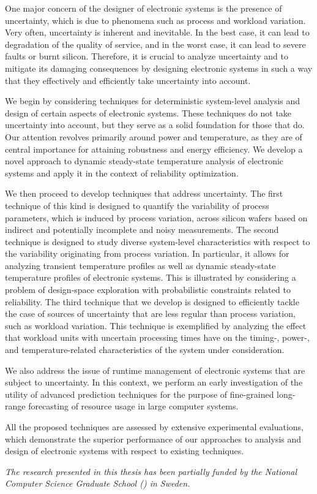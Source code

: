 One major concern of the designer of electronic systems is the presence of
uncertainty, which is due to phenomena such as process and workload variation.
Very often, uncertainty is inherent and inevitable. In the best case, it can
lead to degradation of the quality of service, and in the worst case, it can
lead to severe faults or burnt silicon. Therefore, it is crucial to analyze
uncertainty and to mitigate its damaging consequences by designing electronic
systems in such a way that they effectively and efficiently take uncertainty
into account.

We begin by considering techniques for deterministic system-level analysis and
design of certain aspects of electronic systems. These techniques do not take
uncertainty into account, but they serve as a solid foundation for those that
do. Our attention revolves primarily around power and temperature, as they are
of central importance for attaining robustness and energy efficiency. We develop
a novel approach to dynamic steady-state temperature analysis of electronic
systems and apply it in the context of reliability optimization.

We then proceed to develop techniques that address uncertainty. The first
technique of this kind is designed to quantify the variability of process
parameters, which is induced by process variation, across silicon wafers based
on indirect and potentially incomplete and noisy measurements. The second
technique is designed to study diverse system-level characteristics with respect
to the variability originating from process variation. In particular, it allows
for analyzing transient temperature profiles as well as dynamic steady-state
temperature profiles of electronic systems. This is illustrated by considering a
problem of design-space exploration with probabilistic constraints related to
reliability. The third technique that we develop is designed to efficiently
tackle the case of sources of uncertainty that are less regular than process
variation, such as workload variation. This technique is exemplified by
analyzing the effect that workload units with uncertain processing times have on
the timing-, power-, and temperature-related characteristics of the system under
consideration.

We also address the issue of runtime management of electronic systems that are
subject to uncertainty. In this context, we perform an early investigation of
the utility of advanced prediction techniques for the purpose of fine-grained
long-range forecasting of resource usage in large computer systems.

All the proposed techniques are assessed by extensive experimental evaluations,
which demonstrate the superior performance of our approaches to analysis and
design of electronic systems with respect to existing techniques.

\vspace{1em}
\noindent
\emph{
  The research presented in this thesis has been partially funded by the
  National Computer Science Graduate School () in Sweden.
}
